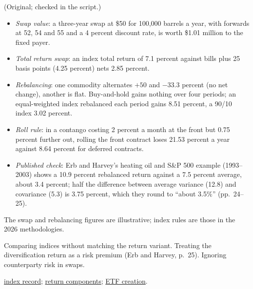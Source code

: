 \begin{qfmethod}
 (Original; checked in the script.)
\begin{itemize}
\item \emph{Swap value}: a three-year swap at \$50 for 100,000 barrels a year, with forwards at 52, 54 and 55 and a 4 percent discount rate, is worth \$1.01 million to the fixed payer.
\item \emph{Total return swap}: an index total return of 7.1 percent against bills plus 25 basis points (4.25 percent) nets 2.85 percent.
\item \emph{Rebalancing}: one commodity alternates $+50$ and $-33.3$ percent (no net change), another is flat. Buy-and-hold gains nothing over four periods; an equal-weighted index rebalanced each period gains 8.51 percent, a 90/10 index 3.02 percent.
\item \emph{Roll rule}: in a contango costing 2 percent a month at the front but 0.75 percent further out, rolling the front contract loses 21.53 percent a year against 8.64 percent for deferred contracts.
\item \emph{Published check}: Erb and Harvey's heating oil and S\&P 500 example (1993--2003) shows a 10.9 percent rebalanced return against a 7.5 percent average, about 3.4 percent; half the difference between average variance (12.8) and covariance (5.3) is 3.75 percent, which they round to ``about 3.5\%'' (pp.~24--25).
\end{itemize}

 The swap and rebalancing figures are illustrative; index rules are those in the 2026 methodologies.

 Comparing indices without matching the return variant. Treating the diversification return as a risk premium (Erb and Harvey, p.~25). Ignoring counterparty risk in swaps.

 \hyperref[def:commodity-indices-risk-return]{index record}; \hyperref[meth:commodity-futures-return-components]{return components}; \hyperref[mech:etf-creation-redemption]{ETF creation}.

\end{qfmethod}

